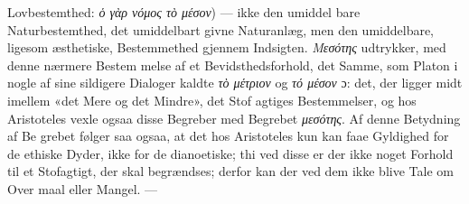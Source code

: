 \documentclass[12pt,a4paper]{book}
\newcommand{\gk}[1]{\textit{#1}}
\begin{document}
%
Lovbestemthed: \gk{ὁ γὰρ νόμος τὸ μέσον}) --- ikke den umiddel\-%
bare Naturbestemthed, det umiddelbart givne Naturanlæg, men
den umiddelbare, ligesom æsthetiske, Bestemmethed gjennem
Indsigten. \gk{Μεσότης} udtrykker, med denne nærmere Bestem\-%
melse af et Bevidsthedsforhold, det Samme, som Platon i nogle
af sine sildigere Dialoger kaldte \gk{τὸ μέτριον} og \gk{τό μέσον} ɔ: det,
der ligger midt imellem «det Mere og det Mindre», det Stof\-%
agtiges Bestemmelser, og hos Aristoteles vexle ogsaa disse
Begreber med Begrebet \gk{μεσότης}. Af denne Betydning af Be\-%
grebet følger saa ogsaa, at det hos Aristoteles kun kan faae
Gyldighed for de ethiske Dyder, ikke for de dianoetiske; thi
ved disse er der ikke noget Forhold til et Stofagtigt, der skal
begrændses; derfor kan der ved dem ikke blive Tale om Over\-%
maal eller Mangel. ---
\end{document}
